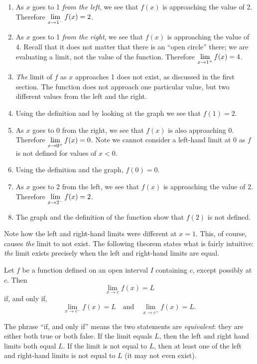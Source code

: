 \begin{example}
\begin{enumerate}
	\item	As $x$ goes to 1 \emph{from the left}, we see that $f(x)$ is approaching the value of 2. Therefore $\displaystyle \lim_{x\to 1^-} f(x) =2$.
	\item	As $x$ goes to 1 \emph{from the right}, we see that $f(x)$ is approaching the value of 4. Recall that it does not matter that there is an ``open circle'' there; we are evaluating a limit, not the value of the function. Therefore $\displaystyle \lim_{x\to 1^+} f(x)=4$.
	\item	\emph{The} limit of $f$ as $x$ approaches 1 does not exist, as discussed in the first section. The function does not approach one particular value, but two different values from the left and the right.
	\item	Using the definition and by looking at the graph we see that $f(1) = 2$.
	\item	As $x$ goes to 0 from the right, we see that $f(x)$ is also approaching 0. Therefore $\displaystyle \lim_{x\to 0^+} f(x)=0$. Note we cannot consider a left-hand limit at 0 as $f$ is not defined for values of $x<0$.
	\item	Using the definition and the graph, $f(0) = 0$.
	\item	As $x$ goes to 2 from the left, we see that $f(x)$ is approaching the value of 2. Therefore $\displaystyle \lim_{x\to 2^-} f(x)=2$.
	\item	The graph and the definition of the function show that $f(2)$ is not defined.
\end{enumerate}
\end{example}

Note how the left and right-hand limits were different at $x=1$. This, of course, causes \emph{the} limit to not exist. The following theorem states what is fairly intuitive: \emph{the} limit exists precisely when the left and right-hand limits are equal.

\begin{theorem}\label{thm:leftrightlimits}%
Let $f$ be a function defined on an open interval $I$ containing $c$, except possibly at $c$.  Then\vspace{-.5\baselineskip}
\[\lim_{x\to c}f(x) = L\]
if, and only if,\vspace{-.5\baselineskip}
\[\lim_{x\to c^-}f(x) = L \quad \text{and} \quad \lim_{x\to c^+}f(x) = L.\]
\end{theorem}

The phrase ``if, and only if'' means the two statements are \emph{equivalent}: they are either both true or both false. If the limit equals $L$, then the left and right hand limits both equal $L$. If the limit is not equal to $L$, then at least one of the left and right-hand limits is not equal to $L$ (it may not even exist).
			
